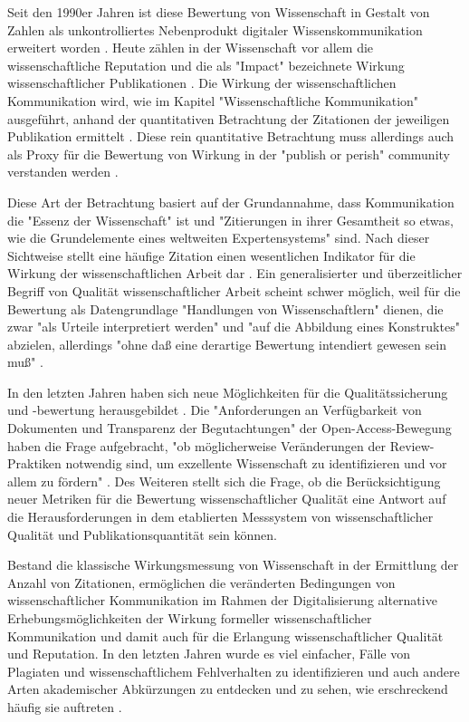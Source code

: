 Seit den 1990er Jahren ist diese Bewertung von Wissenschaft in Gestalt von Zahlen als unkontrolliertes Nebenprodukt digitaler Wissenskommunikation erweitert worden \cite{angermueller_2010}. Heute zählen in der Wissenschaft vor allem die wissenschaftliche Reputation und die als "Impact" bezeichnete Wirkung wissenschaftlicher Publikationen \cite{herb_open_2013} \cite{Hornbostel_1997}. Die Wirkung der wissenschaftlichen Kommunikation wird, wie im Kapitel "Wissenschaftliche Kommunikation" ausgeführt, anhand der quantitativen Betrachtung der Zitationen der jeweiligen Publikation ermittelt \cite{Brembs_2013} \cite[:16]{haustein_2012_multidimensional} \cite{weller2011twitter}. Diese rein quantitative Betrachtung muss allerdings auch als Proxy für die Bewertung von Wirkung in der "publish or perish" community verstanden werden \cite{peters_2015_research}.

Diese Art der Betrachtung basiert auf der Grundannahme, dass Kommunikation die "Essenz der Wissenschaft" \cite{bonitz_1998_matthaus} ist und "Zitierungen in ihrer Gesamtheit so etwas, wie die Grundelemente eines weltweiten Expertensystems" \cite{bonitz_1990_sci} sind. Nach dieser Sichtweise stellt eine häufige Zitation einen wesentlichen Indikator für die Wirkung der wissenschaftlichen Arbeit dar \cite{hamilton_1990_publishing}. Ein generalisierter und überzeitlicher Begriff von Qualität wissenschaftlicher Arbeit scheint schwer möglich, weil für die Bewertung als Datengrundlage "Handlungen von Wissenschaftlern" dienen, die zwar "als Urteile interpretiert werden" und "auf die Abbildung eines Konstruktes" abzielen, allerdings "ohne daß eine derartige Bewertung intendiert gewesen sein muß" \cite[:186]{Hornbostel_1997}.

In den letzten Jahren haben sich neue Möglichkeiten für die Qualitätssicherung und -bewertung herausgebildet \cite{rekdal_2014_academic}. Die "Anforderungen an Verfügbarkeit von Dokumenten und Transparenz der Begutachtungen" der Open-Access-Bewegung haben die Frage aufgebracht, "ob möglicherweise Veränderungen der Review-Praktiken notwendig sind, um exzellente Wissenschaft zu identifizieren und vor allem zu fördern" \cite[:5]{Neidhardt_2006}. Des Weiteren stellt sich die Frage, ob die Berücksichtigung neuer Metriken für die Bewertung wissenschaftlicher Qualität eine Antwort auf die Herausforderungen in dem etablierten Messsystem von wissenschaftlicher Qualität und Publikationsquantität sein können.

Bestand die klassische Wirkungsmessung von Wissenschaft in der Ermittlung der Anzahl von Zitationen, ermöglichen die veränderten Bedingungen von wissenschaftlicher Kommunikation im Rahmen der Digitalisierung alternative Erhebungsmöglichkeiten der Wirkung formeller wissenschaftlicher Kommunikation und damit auch für die Erlangung wissenschaftlicher Qualität und Reputation. In den letzten Jahren wurde es viel einfacher, Fälle von Plagiaten und wissenschaftlichem Fehlverhalten zu identifizieren und auch andere Arten akademischer Abkürzungen zu entdecken und zu sehen, wie erschreckend häufig sie auftreten \cite{rekdal_2014_academic}.

